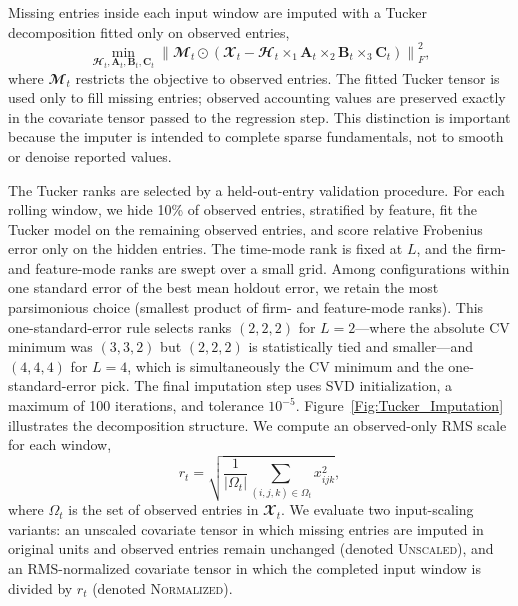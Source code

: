 \documentclass[pdflatex,sn-mathphys-num]{sn-jnl}%
\theoremstyle{thmstyleone}%
\theoremstyle{thmstyletwo}%
\theoremstyle{thmstylethree}%
\begin{document}
Missing entries inside each input window are imputed with a Tucker decomposition fitted only on observed entries,
\begin{equation}
\min_{\mathbfcal{H}_t,\mathbf{A}_t,\mathbf{B}_t,\mathbf{C}_t}
\left\| \mathbfcal{M}_t \odot \left(\mathbfcal{X}_t -
\mathbfcal{H}_t \times_1 \mathbf{A}_t \times_2 \mathbf{B}_t \times_3 \mathbf{C}_t \right) \right\|_F^2,
\end{equation}
where $\mathbfcal{M}_t$ restricts the objective to observed entries. The fitted Tucker tensor is used only to fill missing entries; observed accounting values are preserved exactly in the covariate tensor passed to the regression step. This distinction is important because the imputer is intended to complete sparse fundamentals, not to smooth or denoise reported values.

The Tucker ranks are selected by a held-out-entry validation procedure. For each rolling window, we hide 10\% of observed entries, stratified by feature, fit the Tucker model on the remaining observed entries, and score relative Frobenius error only on the hidden entries. The time-mode rank is fixed at $L$, and the firm- and feature-mode ranks are swept over a small grid. Among configurations within one standard error of the best mean holdout error, we retain the most parsimonious choice (smallest product of firm- and feature-mode ranks). This one-standard-error rule selects ranks $(2,2,2)$ for $L=2$---where the absolute CV minimum was $(3,3,2)$ but $(2,2,2)$ is statistically tied and smaller---and $(4,4,4)$ for $L=4$, which is simultaneously the CV minimum and the one-standard-error pick. The final imputation step uses SVD initialization, a maximum of 100 iterations, and tolerance $10^{-5}$. Figure~\ref{Fig:Tucker_Imputation} illustrates the decomposition structure. We compute an observed-only RMS scale for each window,
\begin{equation}
r_t = \sqrt{\frac{1}{|\Omega_t|}\sum_{(i,j,k)\in\Omega_t} x_{ijk}^2},
\end{equation}
where $\Omega_t$ is the set of observed entries in $\mathbfcal{X}_t$. We evaluate two input-scaling variants: an unscaled covariate tensor in which missing entries are imputed in original units and observed entries remain unchanged (denoted \textsc{Unscaled}), and an RMS-normalized covariate tensor in which the completed input window is divided by $r_t$ (denoted \textsc{Normalized}).
\end{document}

